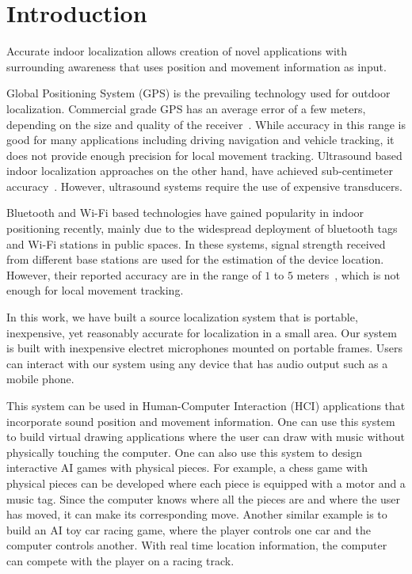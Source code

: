 \chapter{Introduction}

Accurate indoor localization allows creation of novel applications with surrounding awareness that uses position and movement information as input. 

Global Positioning System (GPS) is the prevailing technology used for outdoor localization. Commercial grade GPS has an average error of a few meters, depending on the size and quality of the receiver~\cite{intro:gps}. While accuracy in this range is good for many applications including driving navigation and vehicle tracking, it does not provide enough precision for local movement tracking. Ultrasound based indoor localization approaches on the other hand, have achieved sub-centimeter accuracy~\cite{intro:ultra}. However, ultrasound systems require the use of expensive transducers.

Bluetooth and Wi-Fi based technologies have gained popularity in indoor positioning recently, mainly due to the widespread deployment of bluetooth tags and Wi-Fi stations in public spaces. In these systems, signal strength received from different base stations are used for the estimation of the device location. However, their reported accuracy are in the range of $1$ to $5$ meters~\cite{intro:blue, intro:loc}, which is not enough for local movement tracking.

In this work, we have built a source localization system that is portable, inexpensive, yet reasonably accurate for localization in a small area. Our system is built with inexpensive electret microphones mounted on portable frames. Users can interact with our system using any device that has audio output such as a mobile phone.

This system can be used in Human-Computer Interaction (HCI) applications that incorporate sound position and movement information. One can use this system to build virtual drawing applications where the user can draw with music without physically touching the computer. One can also use this system to design interactive AI games with physical pieces. For example, a chess game with physical pieces can be developed where each piece is equipped with a motor and a music tag. Since the computer knows where all the pieces are and where the user has moved, it can make its corresponding move. Another similar example is to build an AI toy car racing game, where the player controls one car and the computer controls another. With real time location information, the computer can compete with the player on a racing track. 

